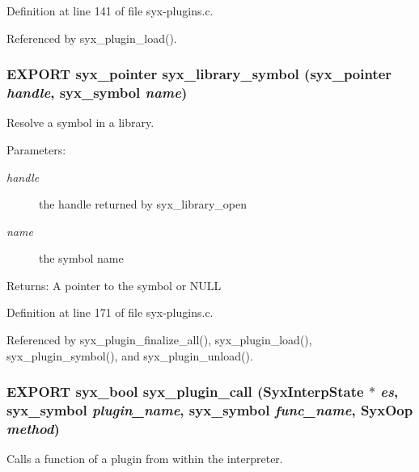 Definition at line 141 of file syx-plugins.c.

Referenced by syx\_\-plugin\_\-load().\hypertarget{syx-plugins_8h_ed01df39e96e573f7b504c4dafd8126a}{
\subsubsection{\setlength{\rightskip}{0pt plus 5cm}EXPORT {\bf syx\_\-pointer} syx\_\-library\_\-symbol ({\bf syx\_\-pointer} {\em handle}, \/  {\bf syx\_\-symbol} {\em name})}}
\label{syx-plugins_8h_ed01df39e96e573f7b504c4dafd8126a}


Resolve a symbol in a library.

\begin{Desc}
\item[Parameters:]
\begin{description}
\item[{\em handle}]the handle returned by syx\_\-library\_\-open \item[{\em name}]the symbol name \end{description}
\end{Desc}
\begin{Desc}
\item[Returns:]A pointer to the symbol or NULL \end{Desc}


Definition at line 171 of file syx-plugins.c.

Referenced by syx\_\-plugin\_\-finalize\_\-all(), syx\_\-plugin\_\-load(), syx\_\-plugin\_\-symbol(), and syx\_\-plugin\_\-unload().\hypertarget{syx-plugins_8h_99c8b337d39d90381b4f135dcd597e4c}{
\subsubsection{\setlength{\rightskip}{0pt plus 5cm}EXPORT {\bf syx\_\-bool} syx\_\-plugin\_\-call ({\bf SyxInterpState} $\ast$ {\em es}, \/  {\bf syx\_\-symbol} {\em plugin\_\-name}, \/  {\bf syx\_\-symbol} {\em func\_\-name}, \/  {\bf SyxOop} {\em method})}}
\label{syx-plugins_8h_99c8b337d39d90381b4f135dcd597e4c}


Calls a function of a plugin from within the interpreter.

